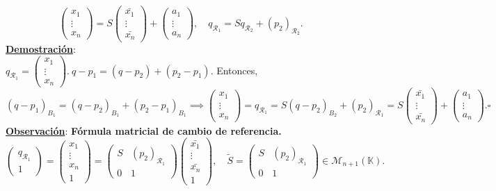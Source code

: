 \documentclass[11pt]{article}
\newcommand{\dem}{\underline{\textbf{Demostración}}:\\}
\newcommand{\obs}{\underline{\textbf{Observación}}: }
\begin{document}
$$
\begin{pmatrix}
x_1\\
\vdots\\
x_n
\end{pmatrix}=S\begin{pmatrix}
\bar{x_1}\\
\vdots\\
\bar{x_n}
\end{pmatrix}+\begin{pmatrix}
a_1\\
\vdots\\
a_n
\end{pmatrix},\quad q_{\mathcal{R}_1}=Sq_{\mathcal{R}_2}+(p_2)_{\mathcal{R}_2}.
$$
\dem $q_{\mathcal{R}_1}=\begin{pmatrix}
x_1\\
\vdots\\
x_n
\end{pmatrix}.\ q-p_1=(q-p_2)+(p_2-p_1).$ Entonces,
$$
(q-p_1)_{B_1}=(q-p_2)_{B_1}+(p_2-p_1)_{B_1}\implies \begin{pmatrix}
x_1\\
\vdots\\
x_n
\end{pmatrix}=q_{\mathcal{R}_1}=S(q-p_2)_{B_2}+(p_2)_{\mathcal{R}_1}=S\begin{pmatrix}
\bar{x_1}\\
\vdots\\
\bar{x_n}
\end{pmatrix}+\begin{pmatrix}
a_1\\
\vdots\\
a_n
\end{pmatrix}.\square
$$
\obs \textbf{Fórmula matricial de cambio de referencia.}
$$
\begin{pmatrix}
q_{\mathcal{R}_1}\\
1
\end{pmatrix}=\begin{pmatrix}
x_1\\
\vdots\\
x_n\\
1
\end{pmatrix}=\left(
\begin{array}{c|c}
S & (p_2)_{\mathcal{R}_1} \\ \hline
0 & 1
\end{array}\right)\begin{pmatrix}
\bar{x_1}\\
\vdots\\
\bar{x_n}\\
1
\end{pmatrix},\quad \tilde{S}=\left(
\begin{array}{c|c}
S & (p_2)_{\mathcal{R}_1} \\ \hline
0 & 1
\end{array}\right)\in\mathcal{M}_{n+1}(\mathbb{K}).
$$
\end{document}
